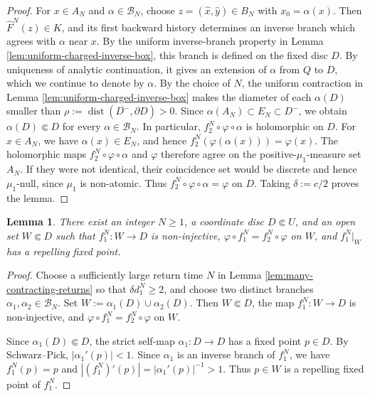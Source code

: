 \documentclass[11pt]{amsart}
\numberwithin{equation}{section}
\theoremstyle{plain}
\newtheorem{lem}[thm]{Lemma}
\theoremstyle{definition}
\theoremstyle{remark}
\begin{document}
\begin{proof}
For $x\in A_N$ and $\alpha\in\mathscr B_N$, 
choose $z=(\hat x,\hat y)\in B_N$ with $x_0=\alpha(x)$.
Then $\hat F^N(z)\in K$, and its first
backward history determines an inverse branch which agrees with
$\alpha$ near $x$. By the uniform inverse-branch property in
Lemma \ref{lem:uniform-charged-inverse-box},
this branch is defined on the fixed
disc $D$. By uniqueness of analytic continuation, it gives an
extension of $\alpha$ from $Q$ to $D$, which we continue to denote
by $\alpha$. 
By the choice of $N$,
the uniform contraction
in Lemma \ref{lem:uniform-charged-inverse-box} makes the diameter of
each $\alpha(D)$ smaller than
$\rho:=\operatorname{dist}(\overline{D^-},\partial D)>0$. Since
$\alpha(A_N)\subset E_N\subset D^-$, we obtain
$\alpha(D)\Subset D$ for every $\alpha\in\mathscr B_N$. In particular,
$f_2^N\circ\varphi\circ\alpha$ is holomorphic on $D$.
For $x\in A_N$, we have $\alpha(x)\in E_N$, and hence
$f_2^N(\varphi(\alpha(x)))=\varphi(x)$. The holomorphic maps
$f_2^N\circ\varphi\circ\alpha$ and $\varphi$ therefore agree on the
positive-$\mu_1$-measure set $A_N$. If they were not identical,
their coincidence set would be discrete and hence $\mu_1$-null,
since $\mu_1$ is non-atomic. Thus
$f_2^N\circ\varphi\circ\alpha=\varphi$ on $D$.
Taking $\delta:=c/2$ proves the lemma.
\end{proof}

\begin{lem}\label{lem:charged-graph-return-configuration}
There exist an integer $N\geq1$, a coordinate disc $D\Subset U$,
and an open set $W\Subset D$ such that
$f_1^N\colon W\to D$ is non-injective,
$\varphi\circ f_1^N=f_2^N\circ\varphi$
on $W$,
and $f_1^N|_W$ has a repelling fixed point.
\end{lem}

\begin{proof}
Choose a sufficiently large return time $N$ in Lemma
\ref{lem:many-contracting-returns} so that
$\delta d_1^N\geq2$, and choose two distinct branches
$\alpha_1,\alpha_2\in\mathscr B_N$. Set
$
W:=\alpha_1(D)\cup\alpha_2(D).
$
Then $W\Subset D$, the map $f_1^N\colon W\to D$ is non-injective,
and
$\varphi\circ f_1^N=f_2^N\circ\varphi$ on $W$.

Since $\alpha_1(D)\Subset D$, the strict self-map
$\alpha_1\colon D\to D$ has a fixed point $p\in D$.
By Schwarz--Pick,
$|\alpha_1'(p)|<1$. Since $\alpha_1$ is an inverse branch of
$f_1^N$, we have
$f_1^N(p)=p$ and
$|(f_1^N)'(p)|=|\alpha_1'(p)|^{-1}>1$.
Thus $p\in W$ is a repelling fixed point of $f_1^N$.
\end{proof}
\end{document}
